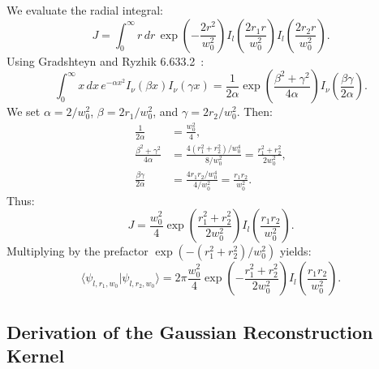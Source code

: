 \documentclass{optica-article}
\begin{document}
We evaluate the radial integral:
\begin{equation}
J = \int_0^\infty r \, dr \, \exp\left( - \frac{2 r^2}{w_0^2} \right) I_l\left( \frac{2 r_1 r}{w_0^2} \right) I_l\left( \frac{2 r_2 r}{w_0^2} \right).
\end{equation}
Using Gradshteyn and Ryzhik 6.633.2~\cite{Gradshteyn2014}:
\begin{equation}
\int_0^\infty x \, dx \, e^{-\alpha x^2} I_\nu(\beta x) I_\nu(\gamma x) = \frac{1}{2\alpha} \exp\left( \frac{\beta^2 + \gamma^2}{4\alpha} \right) I_\nu\left( \frac{\beta \gamma}{2\alpha} \right).
\end{equation}
We set $\alpha = 2 / w_0^2$, $\beta = 2 r_1 / w_0^2$, and $\gamma = 2 r_2 / w_0^2$. Then:
\begin{align}
\frac{1}{2\alpha} &= \frac{w_0^2}{4}, \\
\frac{\beta^2 + \gamma^2}{4\alpha} &= \frac{4(r_1^2 + r_2^2) / w_0^4}{8 / w_0^2} = \frac{r_1^2 + r_2^2}{2 w_0^2}, \\
\frac{\beta \gamma}{2\alpha} &= \frac{4 r_1 r_2 / w_0^4}{4 / w_0^2} = \frac{r_1 r_2}{w_0^2}.
\end{align}
Thus:
\begin{equation}
J = \frac{w_0^2}{4} \exp\left( \frac{r_1^2 + r_2^2}{2 w_0^2} \right) I_l\left( \frac{r_1 r_2}{w_0^2} \right).
\end{equation}
Multiplying by the prefactor $\exp(-(r_1^2 + r_2^2)/w_0^2)$ yields:
\begin{equation}
\langle \psi_{l, r_1, w_0} | \psi_{l, r_2, w_0} \rangle = 2\pi \frac{w_0^2}{4} \exp\left( - \frac{r_1^2 + r_2^2}{2 w_0^2} \right) I_l\left( \frac{r_1 r_2}{w_0^2} \right).
\end{equation}

\subsection{Derivation of the Gaussian Reconstruction Kernel}
\end{document}
